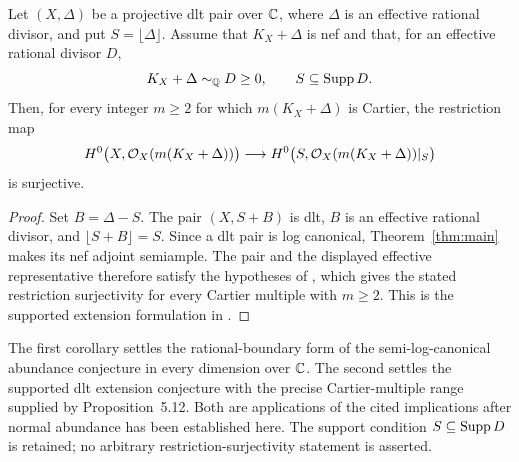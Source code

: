 \begin{corollary}
\label{cor:dlt-extension}
Let \((X,\Delta)\) be a projective dlt pair over \(\mathbb{C}\), where \(\Delta\)
is an effective rational divisor, and put \(S=\lfloor\Delta\rfloor\).
Assume that \(K_X+\Delta\) is nef and that, for an effective rational
divisor \(D\),
\[
 K_X+\Delta\sim_{\mathbb{Q}}D\geq0,
 \qquad S\subseteq\operatorname{Supp} D.
\]
Then, for every integer \(m\geq2\) for which \(m(K_X+\Delta)\) is Cartier,
the restriction map
\[
 H^0\bigl(X,\mathcal{O}_X(m(K_X+\Delta))\bigr)
 \longrightarrow
 H^0\bigl(S,\mathcal{O}_X(m(K_X+\Delta))|_S\bigr)
\]
is surjective.
\end{corollary}
\begin{proof}
Set \(B=\Delta-S\). The pair \((X,S+B)\) is dlt, \(B\) is an effective
rational divisor, and \(\lfloor S+B\rfloor=S\). Since a dlt pair is log
canonical, Theorem~\ref{thm:main} makes its nef adjoint semiample.
The pair and the displayed effective representative therefore satisfy the
hypotheses of \cite[Proposition~5.12]{FujinoGongyo2014}, which gives the
stated restriction surjectivity for every Cartier multiple with \(m\geq2\).
This is the supported extension formulation in
\cite[Conjecture~5.8]{FujinoGongyo2014}.
\end{proof}

The first corollary settles the rational-boundary form of the semi-log-canonical
abundance conjecture \cite[Conjecture~1.3]{FujinoGongyo2014} in every
dimension over \(\mathbb{C}\). The second settles the supported dlt extension
conjecture \cite[Conjectures~1.10 and~5.8]{FujinoGongyo2014} with the precise
Cartier-multiple range supplied by Proposition~5.12. Both are applications
of the cited implications after normal abundance has been established here.
The support condition \(S\subseteq\operatorname{Supp} D\) is retained; no arbitrary
restriction-surjectivity statement is asserted.
